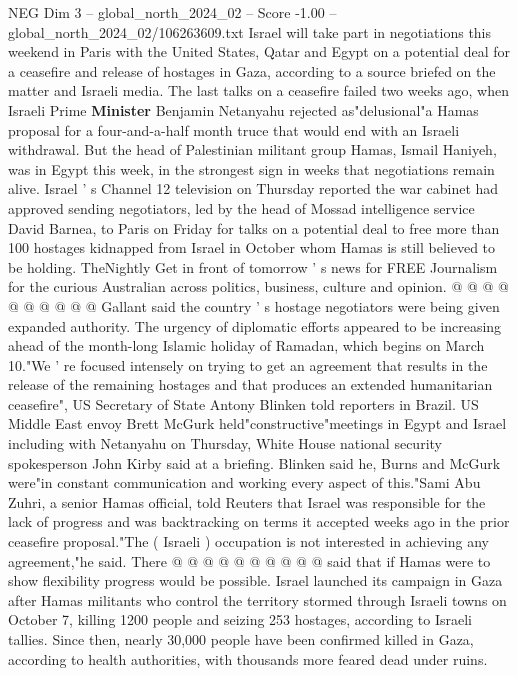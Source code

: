 \begin{textsample}{NEG Dim 3 – global\_north\_2024\_02 – Score -1.00 – global\_north\_2024\_02/106263609.txt}  \label{ex:f3_neg_202}
Israel will take part in negotiations this weekend in Paris with the United States, Qatar and Egypt on a potential deal for a ceasefire and release of hostages in Gaza, according to a source briefed on the matter and Israeli media.
The last talks on a ceasefire failed two weeks ago, when Israeli Prime \textbf{Minister} Benjamin Netanyahu rejected as"delusional"a Hamas proposal for a four-and-a-half month truce that would end with an Israeli withdrawal.
But the head of Palestinian militant group Hamas, Ismail Haniyeh, was in Egypt this week, in the strongest sign in weeks that negotiations remain alive.
Israel ' s Channel 12 television on Thursday reported the war cabinet had approved sending negotiators, led by the head of Mossad intelligence service David Barnea, to Paris on Friday for talks on a potential deal to free more than 100 hostages kidnapped from Israel in October whom Hamas is still believed to be holding.
TheNightly Get in front of tomorrow ' s news for FREE Journalism for the curious Australian across politics, business, culture and opinion. @ @ @ @ @ @ @ @ @ @ Gallant said the country ' s hostage negotiators were being given expanded authority.
The urgency of diplomatic efforts appeared to be increasing ahead of the month-long Islamic holiday of Ramadan, which begins on March 10."We ' re focused intensely on trying to get an agreement that results in the release of the remaining hostages and that produces an extended humanitarian ceasefire", US Secretary of State Antony Blinken told reporters in Brazil.
US Middle East envoy Brett McGurk held"constructive"meetings in Egypt and Israel including with Netanyahu on Thursday, White House national security spokesperson John Kirby said at a briefing.
Blinken said he, Burns and McGurk were"in constant communication and working every aspect of this."Sami Abu Zuhri, a senior Hamas official, told Reuters that Israel was responsible for the lack of progress and was backtracking on terms it accepted weeks ago in the prior ceasefire proposal."The ( Israeli ) occupation is not interested in achieving any agreement,"he said.
There @ @ @ @ @ @ @ @ @ @ said that if Hamas were to show flexibility progress would be possible.
Israel launched its campaign in Gaza after Hamas militants who control the territory stormed through Israeli towns on October 7, killing 1200 people and seizing 253 hostages, according to Israeli tallies.
Since then, nearly 30,000 people have been confirmed killed in Gaza, according to health authorities, with thousands more feared dead under ruins.

\end{textsample}
